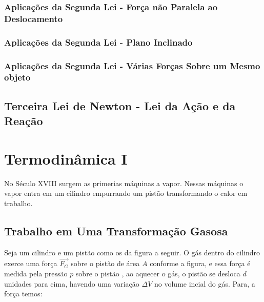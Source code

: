 \documentclass[12pt,a4paper]{book}
\begin{document}

			\subsubsection{Aplicações da Segunda Lei - Força não Paralela ao Deslocamento}

			\subsubsection{Aplicações da Segunda Lei - Plano Inclinado}

			\subsubsection{Aplicações da Segunda Lei - Várias Forças Sobre um Mesmo objeto}

			\subsection{Terceira Lei de Newton - Lei da Ação e da Reação}

	\section{Termodinâmica I} 

No Século XVIII surgem as primerias máquinas a vapor. Nessas máquinas o vapor entra em um cilindro empurrando um pistão transformando o calor em trabalho.


		\subsection{Trabalho em Uma Transformação Gasosa}

Seja um cilindro e um pistão como os da figura a seguir. O gás dentro do cilindro exerce uma força $\vec{F_G}$ sobre o pistão de área $A$ conforme a figura, e essa força é medida pela pressão $p$ sobre o pistão , ao aquecer o gás, o pistão se desloca $d$ unidades para cima, havendo uma variação $\Delta V$ no volume incial do gás. Para, a força temos:
\end{document}
